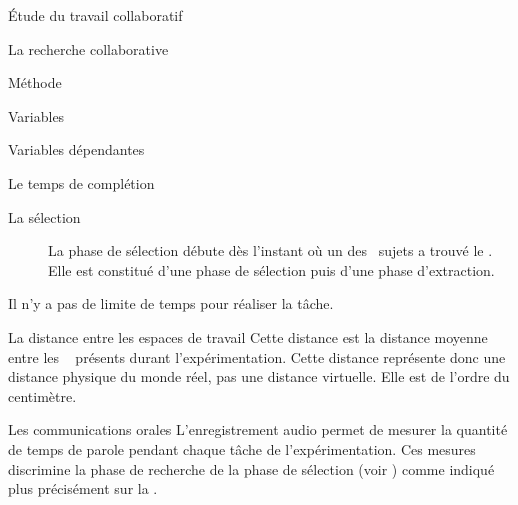\documentclass[myfrancais]{mythesis}
\begin{document}
\begin{mypart}{Étude du travail collaboratif}
\begin{mychapter}{La recherche collaborative}
\begin{mysection}{Méthode}
\begin{mysubsection}{Variables}
\begin{mysubsubsection}{Variables dépendantes}
\begin{myparagraph}{ Le temps de complétion}
\begin{description}
								\item[La sélection] La phase de sélection débute dès l'instant où un des ~sujets a trouvé le .
									Elle est constitué d'une phase de sélection puis d'une phase d'extraction.
							\end{description}
							Il n'y a pas de limite de temps pour réaliser la tâche.
						\end{myparagraph}
						\begin{myparagraph}{ La distance entre les espaces de travail}
							Cette distance est la distance moyenne entre les ~ présents durant l'expérimentation.
							Cette distance représente donc une distance physique du monde réel, pas une distance virtuelle.
							Elle est de l'ordre du centimètre.
						\end{myparagraph}
						\begin{myparagraph}{ Les communications orales}
							L'enregistrement audio permet de mesurer la quantité de temps de parole pendant chaque tâche de l'expérimentation.
							Ces mesures discrimine la phase de recherche de la phase de sélection (voir ) comme indiqué plus précisément sur la .


\end{myparagraph}
\end{mysubsubsection}
\end{mysubsection}
\end{mysection}
\end{mychapter}
\end{mypart}
\end{document}

